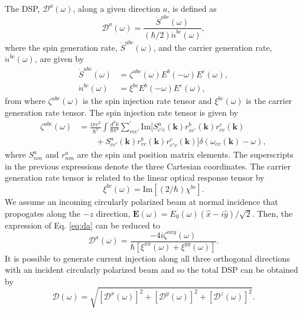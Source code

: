 \documentclass[pss]{wiley2sp} %
\begin{document}
The DSP, $\mathcal{D}^{a}(\omega)$, along a given direction $a$, is defined as
\begin{equation}\label{eq:da}
\mathcal{D}^{a}(\omega)=\frac{\dot{S}^{abc}(\omega)}{(\hbar/2)\dot{n}^{bc}(\omega)},
\end{equation}
where the spin generation rate, $\dot{S}^{abc}(\omega)$, and the carrier generation rate, $\dot{n}^{bc}(\omega)$,  are given by 
\begin{align*}
\dot{S}^{abc}(\omega) &= \zeta^{abc}(\omega)E^{b}(-\omega)E^{c}(\omega), \nonumber \\ 
\dot{n}^{bc}(\omega)  &= \xi^{bc}E^{b}(-\omega)E^{c}(\omega),
\end{align*}
from where $\zeta^{abc}(\omega)$ is the spin injection rate tensor and $\xi^{bc}(\omega)$ is the carrier generation rate tensor. The spin injection rate tensor is given by
\begin{align*}\label{eq:zeta}
\zeta^{abc}(\omega) &= \frac{i\pi e^{2}}{\hbar^{2}}\int\frac{d^{3}k}{8\pi^{3}}
\sum_{vcc'}^{\prime}\text{Im}\bigl[S^{a}_{c'c}(\textbf{k})
r^{b}_{vc'}(\textbf{k})r^{c}_{cv}(\textbf{k})\nonumber\\
&\qquad+S^{a}_{cc'}(\textbf{k})
r^{b}_{vc}(\textbf{k})r^{c}_{c'v}(\textbf{k})\bigr]
\delta(\omega_{cv}(\textbf{k})-\omega),
\end{align*}
where $S^{a}_{nm}$ and $r^{a}_{nm}$ are the spin and position matrix elements. The superscripts in the previous expressions denote the three Cartesian coordinates. The carrier generation rate tensor is related to the linear optical response tensor by 
\begin{equation*}
\xi^{bc}(\omega)=\mathrm{Im}[(2/\hbar)\chi^{bc}].
\end{equation*}
We assume an incoming circularly polarized beam at normal incidence that propogates along the $-z$ direction, $\mathbf{E}(\omega) = E_{0}(\omega)(\hat{x} - i\hat{y})/\sqrt{2}$. Then, the expression of Eq. \eqref{eq:da} can be reduced to
\begin{equation}\label{eq:D^i}
\mathcal{D}^{a}(\omega) = 
\frac{-4i\zeta^{axy}(\omega)}
    {\hbar\left[\xi^{xx}(\omega) + \xi^{yy}(\omega)\right]}.
\end{equation}
It is possible to generate current injection along all three orthogonal directions with
an incident circularly polarized beam and so the total DSP can be obtained by
\begin{equation}\label{eq:dsptotal}
\mathcal{D}(\omega) = \sqrt{ [\mathcal{D}^{x}(\omega)]^{2} + [\mathcal{D}^{y}(\omega)]^{2} +[\mathcal{D}^{z}(\omega)]^{2}}.
\end{equation}
\end{document}
